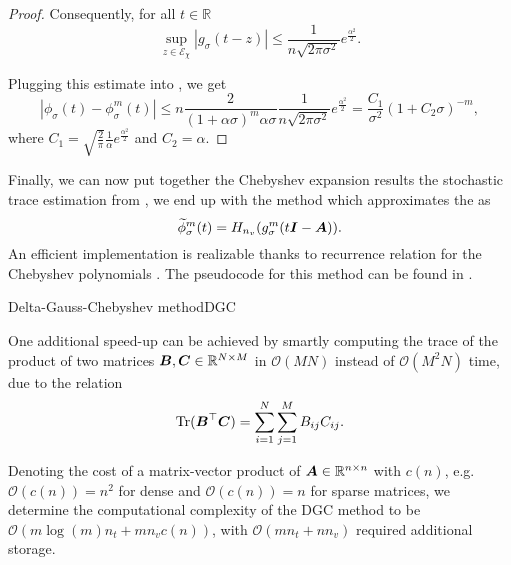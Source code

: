 \begin{proof}
    Consequently, for all $t \in \mathbb{R}$
    \begin{equation}
        \sup_{z \in \mathcal{E}_{\chi}} |g_{\sigma}(t - z)| 
        \leq \frac{1}{n \sqrt{2 \pi \sigma^2}} e^{\frac{\alpha^2}{2}}.
    \end{equation}

    Plugging this estimate into , we get
    \begin{equation}
        \left| \phi_{\sigma}(t) - \phi_{\sigma}^m(t) \right|
        \leq n \frac{2}{(1 + \alpha\sigma)^m\alpha \sigma} \frac{1}{n \sqrt{2 \pi \sigma^2}} e^{\frac{\alpha^2}{2}}
        = \frac{C_1}{\sigma^2} (1 + C_2 \sigma)^{-m},
    \end{equation}
    where $C_1=\sqrt{\frac{2}{\pi}}\frac{1}{\alpha}e^{\frac{\alpha^2}{2}}$ and $C_2=\alpha$.
\end{proof}

Finally,  we can now put together the 
Chebyshev expansion results
the stochastic trace estimation from ,
we end up with the  method \cite[algorithm~2]{lin2017randomized}
which approximates the  as
\begin{equation}
    \widetilde{\phi}_{\sigma}^m(t) = H_{n_v}(g_{\sigma}^m(t\boldsymbol{I} - \boldsymbol{A})).
    \label{equ:2-chebyshev-DGC-final-estimator}
\end{equation}
An efficient implementation is realizable thanks to recurrence relation for the
Chebyshev polynomials . The pseudocode
for this method can be found in .

\begin{algo}{Delta-Gauss-Chebyshev method}{DGC}
    
\end{algo}

One additional speed-up can be achieved by smartly computing the trace of the 
product of two matrices $\boldsymbol{B}, \boldsymbol{C} \in \mathbb{R}^{N \times M}$ in
$\mathcal{O}(MN)$ instead of $\mathcal{O}(M^2N)$ time, due to the relation
\begin{equation}
    \operatorname{Tr}(\boldsymbol{B}^{\top}\boldsymbol{C}) = \sum_{i=1}^{N} \sum_{j=1}^{M} B_{ij} C_{ij}.
    \label{equ:2-chebyshev-fast-trace}
\end{equation}

Denoting the cost of a matrix-vector product of $\boldsymbol{A} \in \mathbb{R}^{n \times n}$
with $c(n)$, e.g. $\mathcal{O}(c(n)) = n^2$ for dense and
$\mathcal{O}(c(n)) = n$ for sparse matrices, we determine the computational
complexity of the \gls{DGC} method to be $\mathcal{O}(m \log(m) n_t + m n_v c(n))$,
with $\mathcal{O}(m n_t + n n_v)$ required additional storage.
